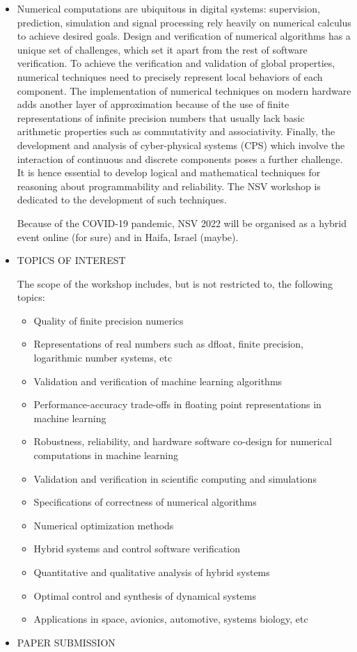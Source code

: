 \documentclass[prodmode,acmtecs]{acmsmall} %
\begin{document}
\begin{itemize}\item   Numerical computations are ubiquitous in digital systems: supervision, prediction, simulation and signal processing rely heavily on numerical calculus to achieve desired goals. Design and verification of numerical algorithms has a unique set of challenges, which set it apart from the rest of software verification. To achieve the verification and validation of global properties, numerical techniques need to precisely represent local behaviors of each component. The implementation of numerical techniques on modern hardware adds another layer of approximation because of the use of finite representations of infinite precision numbers that usually lack basic arithmetic properties such as commutativity and associativity. Finally, the development and analysis of cyber-physical systems (CPS) which involve the interaction of continuous and discrete components poses a further challenge. It is hence essential to develop logical and mathematical techniques for reasoning about programmability and reliability. The NSV workshop is dedicated to the development of such techniques. 
 
  Because of the COVID-19 pandemic, NSV 2022 will be organised as a hybrid event online (for sure) and in Haifa, Israel (maybe). 
 
\item  TOPICS OF INTEREST 
 
  The scope of the workshop includes, but is not restricted to, the following topics:  
 
\begin{itemize}\item  Quality of finite precision numerics 
\item  Representations of real numbers such as dfloat, finite precision, logarithmic number systems, etc 
\item  Validation and verification of machine learning algorithms 
\item  Performance-accuracy trade-offs in floating point representations in machine learning 
\item  Robustness, reliability, and hardware software co-design for numerical computations in machine learning 
\item  Validation and verification in scientific computing and simulations 
\item  Specifications of correctness of numerical algorithms  
\item  Numerical optimization methods 
\item  Hybrid systems and control software verification 
\item  Quantitative and qualitative analysis of hybrid systems 
\item  Optimal control and synthesis of dynamical systems 
\item  Applications in space, avionics, automotive, systems biology, etc 
\end{itemize} 
\item  PAPER SUBMISSION  
 

\end{itemize}
\end{document}
